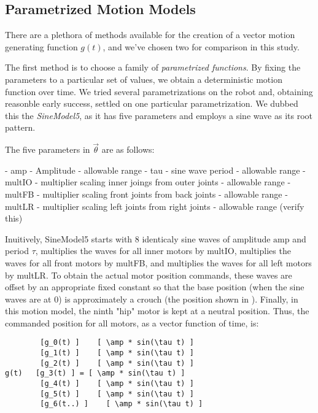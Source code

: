 \subsection{Parametrized Motion Models}

 There are a plethora of methods available for the creation of a vector motion generating function $g(t)$, and we've chosen two for comparison in this study.

The first method is to choose a family of \emph{parametrized functions}.  By fixing the parameters to a particular set of values, we obtain a deterministic motion function over time.  We tried several parametrizations on the robot and, obtaining reasonble early success, settled on one particular parametrization.  We dubbed this the \emph{SineModel5}, as it has five parameters and employs a sine wave as its root pattern.

The five parameters in $\vec{\theta}$ are as follows:

 - amp - Amplitude       - allowable range
 - tau   - sine wave period   - allowable range
 - multIO - multiplier scaling inner joings from outer joints  - allowable range
 - multFB - multiplier scaling front joints from back joints  - allowable range
 - multLR - multiplier scaling left joints from right joints  - allowable range
(verify this)

\newcommand{\amp}{\mathrm{amp}}

Inuitively, SineModel5 starts with 8 identicaly sine waves of amplitude $\amp$ and period $\tau$, multiplies the waves for all inner motors by multIO, multiplies the waves for all front motors by multFB, and multiplies the waves for all left motors by multLR.  To obtain the actual motor position commands, these waves are offset by an appropriate fixed constant so that the base position (when the sine waves are at 0) is approximately a crouch (the position shown in ).  Finally, in this motion model, the ninth "hip" motor is kept at a neutral position.  Thus, the commanded position for all motors, as a vector function of time, is:

\begin{verbatim}
        [g_0(t) ]    [ \amp * sin(\tau t) ]
        [g_1(t) ]    [ \amp * sin(\tau t) ]
        [g_2(t) ]    [ \amp * sin(\tau t) ]
g(t)   [g_3(t) ] = [ \amp * sin(\tau t) ]
        [g_4(t) ]    [ \amp * sin(\tau t) ]
        [g_5(t) ]    [ \amp * sin(\tau t) ]
        [g_6(t..) ]    [ \amp * sin(\tau t) ]
\end{verbatim}

